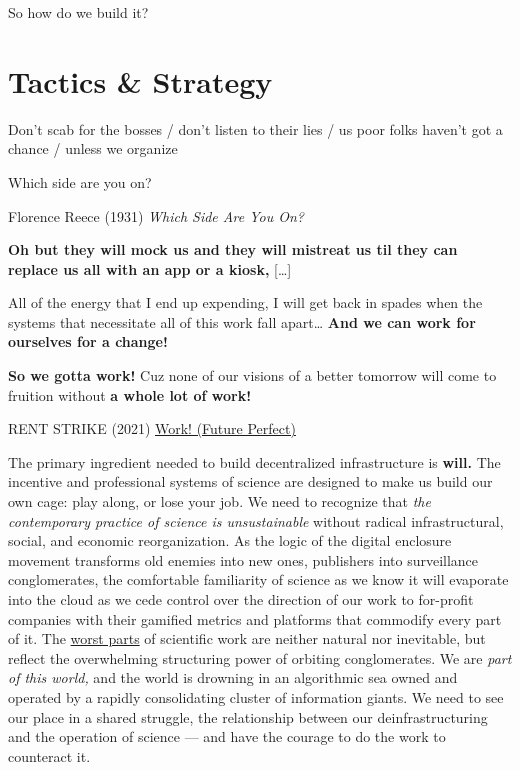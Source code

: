 So how do we build it?

\hypertarget{tactics-strategy}{%
\section{Tactics \& Strategy}\label{tactics-strategy}}

\begin{leftbar}
Don't scab for the bosses / don't listen to their lies / us poor folks
haven't got a chance / unless we organize

Which side are you on?

Florence Reece (1931) \emph{Which Side Are You On?}
\end{leftbar}

\begin{leftbar}
\textbf{Oh but they will mock us and they will mistreat us til they can
replace us all with an app or a kiosk,} {[}\ldots{]}

All of the energy that I end up expending, I will get back in spades
when the systems that necessitate all of this work fall apart\ldots{}
\textbf{And we can work for ourselves for a change!}

\textbf{So we gotta work!} Cuz none of our visions of a better tomorrow will come
to fruition without \textbf{a whole lot of work!}

RENT STRIKE (2021)
\href{https://rentstrike.bandcamp.com/track/work-future-perfect-2}{Work!
(Future Perfect)} \citep{rentstrikeWorkFuturePerfect2021} 
\end{leftbar}

The primary ingredient needed to build decentralized infrastructure is
\textbf{will.} The incentive and professional systems of science are
designed to make us build our own cage: play along, or lose your job. We
need to recognize that \emph{the contemporary practice of science is
unsustainable} without radical infrastructural, social, and economic
reorganization. As the logic of the digital enclosure movement
transforms old enemies into new ones, publishers into surveillance
conglomerates, the comfortable familiarity of science as we know it will
evaporate into the cloud as we cede control over the direction of our
work to for-profit companies with their gamified metrics and platforms
that commodify every part of it. The
\protect\hyperlink{the-state-of-things}{worst parts} of scientific work
are neither natural nor inevitable, but reflect the overwhelming
structuring power of orbiting conglomerates. We are \emph{part of this
world,} and the world is drowning in an algorithmic sea owned and
operated by a rapidly consolidating cluster of information giants. We
need to see our place in a shared struggle, the relationship between our
deinfrastructuring and the operation of science --- and have the courage
to do the work to counteract it.

